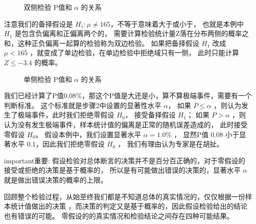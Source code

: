 \documentclass[letterpaper,10pt,english]{sphinxmanual}
\begin{document}
\begin{figure}[htbp]
\centering
\capstart

\noindent{}
\caption{双侧检验 P值和 \(\alpha\) 的关系}\label{\detokenize{_u63a8_u65ad_u4e0e_u68c0_u9a8c/content:id32}}\label{\detokenize{_u63a8_u65ad_u4e0e_u68c0_u9a8c/content:pic-influence-me-105}}\end{figure}

注意我们的备择假设是 \(H_1:\mu \neq 165\)，不等于意味着大于或小于，
也就是本例中 \(H_1\) 是包含负偏离和正偏离两个的，
需要计算检验统计量Z落在分布两侧的概率之和，这种正负偏离一起算的检验称为双边检验。
如果把备择假设 \(H_1\) 改成 \(\mu <165\) ，就变成了单边检验，在单边检验中拒绝域只有一侧，
此时只能计算 \(Z \le -3.4\) 的概率。

\begin{figure}[htbp]
\centering
\capstart

\noindent{}
\caption{单侧检验 P值和 \(\alpha\) 的关系}\label{\detokenize{_u63a8_u65ad_u4e0e_u68c0_u9a8c/content:id33}}\label{\detokenize{_u63a8_u65ad_u4e0e_u68c0_u9a8c/content:pic-influence-me-106}}\end{figure}

我们已经计算了P值0.08\%，那这个P值是大还是小，算不算极端事件，需要有一个判断标准。
这个标准就是步骤2中设置的显著性水平 \(\alpha\)，
如果 \(P \le \alpha\) ，则认为发生了极端事件，此时我们拒绝零假设 \(H_0\)，
接受备择假设  \(H_1\)；
如果 \(P > \alpha\) ，则认为没有发生极端事件，样本统计值的偏离是正常的随机误差造成的，
此时接受零假设 \(H_0\)。
假设本例中，我们设置显著水平 \(\alpha=1.0\%\) ，
显然P值 \(0.08\) 小于显著水平 \(0.1\)，因此我们拒绝零假设 \(H_0\) ，
我们有理由认为专家是在胡扯。


\begin{sphinxadmonition}{important}{重要:}
假设检验对总体断言的决策并不是百分百正确的，对于零假设的接受或拒绝的决策是基于概率的，
所以是有可能做出错误的决策的，显著水平 \(\alpha\) 就是做出错误决策的概率的上限。
\end{sphinxadmonition}

回顾整个检验过程，从始至终我们都是不知道总体的真实情况的，仅仅根据一份样本统计值做出的决策
，而决策的判定又是基于概率的，因此假设检验给出的结论也有错误的可能。
零假设的的真实情况和检验结论之间存在四种可能结果。
\end{document}
